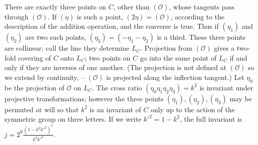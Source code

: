 There are exactly three points on $C$, other than $(\mathcal{O})$, whose
tangents pass through $(\mathcal{O})$. If $(\eta)$ is such a point,
$(2\eta)=(\mathcal{O})$, according to the description of the addition
operation, and the converse is true. Thus if $(\eta_{1})$ and
$(\eta_{2})$ are two such points, $(\eta_{3})=(-\eta_{1}-\eta_{2})$ is a
third. These three points are collinear; call the line they determine
$L_{C}$. Projection from $(\mathcal{O})$ gives a two-fold covering of
$C$ onto $L_{C}$; two points on $C$ go into the same point of $L_{C}$ if
and only if they are inverses of one another. (The projection is not
defined at $(\mathcal{O})$ so we extend by continuity, -- $(\mathcal{O})$
is projected along the inflection tangent.) Let $\eta_{0}$ be the
projection of $\mathcal{O}$ on $L_{C}$. The cross ratio
$(\eta_{0}\eta_{1}\eta_{2}\eta_{3})=k^{2}$ is invariant under projective
transformations; however the three points $(\eta_{1}),(\eta_{2}),
(\eta_{3})$ may be permuted at will so that $k^{2}$ is an invariant of
$C$ only up to the action of the symmetric group on three letters. If we
write $k'^{2}=1-k^{2}$, the full invariant is
$j=2^{8}\frac{(1-k^{2}k'^{2})^{3}}{k^{4}k'^{4}}$.

